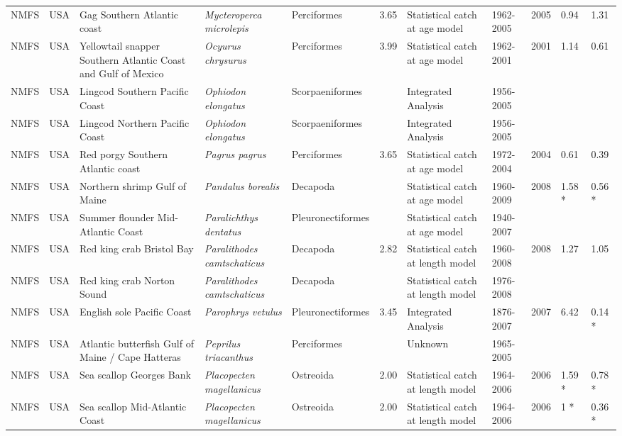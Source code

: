 \begin{longtable}{p{1.5cm}p{1.5cm}p{3cm}p{3cm}p{2.5cm}p{0.9cm}p{1.4cm}p{0.9cm}p{0.9cm}p{0.9cm}p{1cm}}
  NMFS & USA & Gag Southern Atlantic coast & \textit{Mycteroperca microlepis} & Perciformes & 3.65 & Statistical catch at age model & 1962-2005 & 2005 & 0.94 & 1.31 \\ 
  NMFS & USA & Yellowtail snapper Southern Atlantic Coast and Gulf of Mexico & \textit{Ocyurus chrysurus} & Perciformes & 3.99 & Statistical catch at age model & 1962-2001 & 2001 & 1.14 & 0.61 \\ 
  NMFS & USA & Lingcod Southern Pacific Coast & \textit{Ophiodon elongatus} & Scorpaeniformes &  & Integrated Analysis & 1956-2005 &  &  &  \\ 
  NMFS & USA & Lingcod Northern Pacific Coast & \textit{Ophiodon elongatus} & Scorpaeniformes &  & Integrated Analysis & 1956-2005 &  &  &  \\ 
  NMFS & USA & Red porgy Southern Atlantic coast & \textit{Pagrus pagrus} & Perciformes & 3.65 & Statistical catch at age model & 1972-2004 & 2004 & 0.61 & 0.39 \\ 
  NMFS & USA & Northern shrimp Gulf of Maine & \textit{Pandalus borealis} & Decapoda &  & Statistical catch at age model & 1960-2009 & 2008 & 1.58 * & 0.56 * \\ 
  NMFS & USA & Summer flounder Mid-Atlantic Coast & \textit{Paralichthys dentatus} & Pleuronectiformes &  & Statistical catch at age model & 1940-2007 &  &  &  \\ 
  NMFS & USA & Red king crab Bristol Bay & \textit{Paralithodes camtschaticus} & Decapoda & 2.82 & Statistical catch at length model & 1960-2008 & 2008 & 1.27 & 1.05 \\ 
  NMFS & USA & Red king crab Norton Sound & \textit{Paralithodes camtschaticus} & Decapoda &  & Statistical catch at length model & 1976-2008 &  &  &  \\ 
  NMFS & USA & English sole Pacific Coast & \textit{Parophrys vetulus} & Pleuronectiformes & 3.45 & Integrated Analysis & 1876-2007 & 2007 & 6.42 & 0.14 * \\ 
  NMFS & USA & Atlantic butterfish Gulf of Maine / Cape Hatteras & \textit{Peprilus triacanthus} & Perciformes &  & Unknown & 1965-2005 &  &  &  \\ 
  NMFS & USA & Sea scallop Georges Bank & \textit{Placopecten magellanicus} & Ostreoida & 2.00 & Statistical catch at length model & 1964-2006 & 2006 & 1.59 * & 0.78 * \\ 
  NMFS & USA & Sea scallop Mid-Atlantic Coast & \textit{Placopecten magellanicus} & Ostreoida & 2.00 & Statistical catch at length model & 1964-2006 & 2006 & 1 * & 0.36 * \\ 

\end{longtable}
